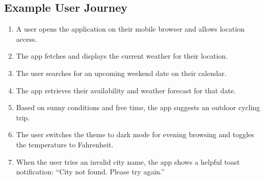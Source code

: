 \documentclass[fontsize=13pt,a4paper]{scrartcl}
\begin{document}
\subsection{Example User Journey}
\begin{enumerate}[nosep]
  \item A user opens the application on their mobile browser and allows location access.
  \item The app fetches and displays the current weather for their location.
  \item The user searches for an upcoming weekend date on their calendar.
  \item The app retrieves their availability and weather forecast for that date.
  \item Based on sunny conditions and free time, the app suggests an outdoor cycling trip.
  \item The user switches the theme to dark mode for evening browsing and toggles the temperature to Fahrenheit.
  \item When the user tries an invalid city name, the app shows a helpful toast notification: “City not found. Please try again.”
\end{enumerate}

\newpage
\end{document}
